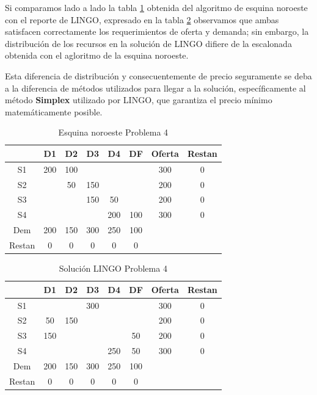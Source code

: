 \documentclass[12pt]{article}  %
\begin{document}

Si comparamos lado a lado la tabla \ref{tab:esqNorEstProb4} obtenida del algoritmo de esquina noroeste con el reporte de LINGO, expresado en la tabla \ref{tab:solLingoProb4} observamos que ambas satisfacen correctamente los requerimientos de oferta y demanda; sin embargo, la distribución de los recursos en la solución de LINGO difiere de la escalonada obtenida con el agloritmo de la esquina noroeste.

Esta diferencia de distribución y consecuentemente de precio seguramente se deba a la diferencia de métodos utilizados para llegar a la solución, específicamente al método \textbf{Simplex} utilizado por LINGO, que garantiza el precio mínimo matemáticamente posible.

\begin{table}[H]
\centering
\caption{Esquina noroeste Problema 4}
\label{tab:esqNorEstProb4}
\begin{tabular}{c|ccccc|cc}
& D1 & D2 & D3 & D4 & DF & Oferta & Restan \\
\hline
S1 & 200 & 100 & & & & 300 & 0 \\
S2 & & 50 & 150 & & & 200 & 0 \\
S3 & & & 150 & 50 & & 200 & 0 \\
S4 & & & & 200 & 100 & 300 & 0 \\
\hline
Dem & 200 & 150 & 300 & 250 & 100 & & \\
Restan & 0 & 0 & 0 & 0 & 0 & & 
\end{tabular}
\end{table}

\begin{table}[H]
\centering
\caption{Solución LINGO Problema 4}
\label{tab:solLingoProb4}
\begin{tabular}{c|ccccc|cc}
& D1 & D2 & D3 & D4 & DF & Oferta & Restan \\
\hline
S1 & & & 300 & & & 300 & 0 \\
S2 & 50 & 150 & & & & 200 & 0 \\
S3 & 150 & & & & 50 & 200 & 0 \\
S4 & & & & 250 & 50 & 300 & 0 \\
\hline
Dem & 200 & 150 & 300 & 250 & 100 & & \\
Restan & 0 & 0 & 0 & 0 & 0 & & 
\end{tabular}
\end{table}
\end{document}

